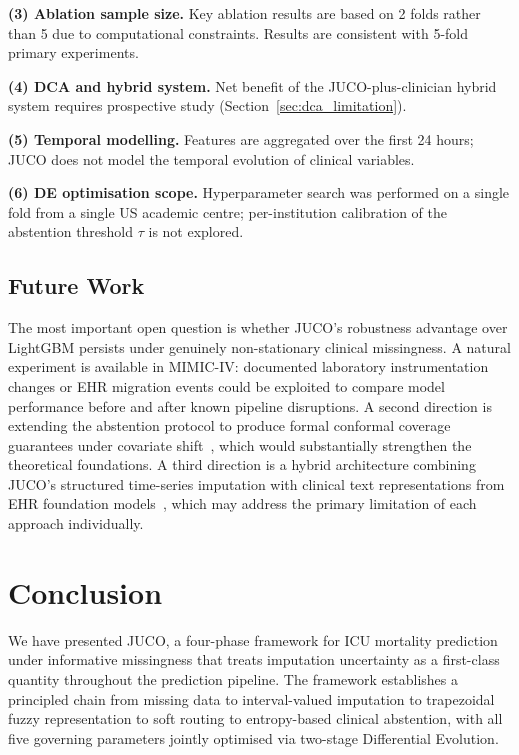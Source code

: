 \documentclass[a4paper,fleqn,longmktitle]{cas-sc}
\begin{document}
	\textbf{(3) Ablation sample size.}
	Key ablation results are based on 2 folds rather than 5 due to
	computational constraints.
	Results are consistent with 5-fold primary experiments.
	
	\textbf{(4) DCA and hybrid system.}
	Net benefit of the JUCO-plus-clinician hybrid system requires
	prospective study (Section~\ref{sec:dca_limitation}).
	
	\textbf{(5) Temporal modelling.}
	Features are aggregated over the first 24 hours; JUCO does not
	model the temporal evolution of clinical variables.
	
	\textbf{(6) DE optimisation scope.}
	Hyperparameter search was performed on a single fold from a single
	US academic centre; per-institution calibration of the abstention
	threshold $\tau$ is not explored.
	\clearpage
	\subsection{Future Work}
	\label{sec:future_work}
	
	The most important open question is whether JUCO's robustness
	advantage over LightGBM persists under genuinely non-stationary
	clinical missingness.
	A natural experiment is available in MIMIC-IV: documented laboratory
	instrumentation changes or EHR migration events could be exploited to
	compare model performance before and after known pipeline disruptions.
	A second direction is extending the abstention protocol to produce
	formal conformal coverage guarantees under covariate
	shift~\citep{tibshirani2019conformal}, which would substantially
	strengthen the theoretical foundations.
	A third direction is a hybrid architecture combining JUCO's
	structured time-series imputation with clinical text
	representations from EHR foundation
	models~\citep{peng2023study}, which may address the primary
	limitation of each approach individually.
	
	
	
	\section{Conclusion}
	\label{sec:conclusion}
	
	We have presented JUCO, a four-phase framework for ICU mortality
	prediction under informative missingness that treats imputation
	uncertainty as a first-class quantity throughout the prediction
	pipeline.
	The framework establishes a principled chain from missing data
	to interval-valued imputation to trapezoidal fuzzy representation
	to soft routing to entropy-based clinical abstention, with all
	five governing parameters jointly optimised via two-stage
	Differential Evolution.
	
\end{document}
